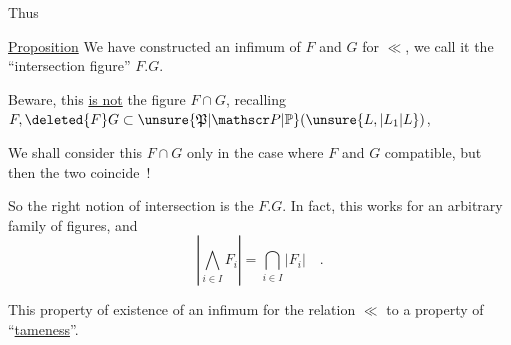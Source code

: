 

Thus

\uline{Proposition} We have constructed an infimum of $F$ and $G$ for $\ll$, we call it the ``intersection figure'' $F.G$.

Beware, this \uline{is not}  the figure $F\cap G$,  recalling $F,\deleted{F}G\subset\unsure{\mathfrak P|\mathscr P|\mathbb P}(\unsure{L,|L_1|L})$, 

We shall consider this $F\cap G$ only in the case where $F$ and $G$ compatible, but then the two coincide~!

So the right notion of intersection is the $F.G$. In fact, this works for an arbitrary family of figures, and
\[
 \left|\bigwedge_{i\in I} F_i\right|=\bigcap_{i\in I}|F_i|\quad .
\]

This property of existence of an infimum for the relation $\ll$   to a property of ``\uline{tameness}''.

